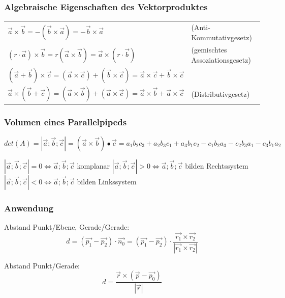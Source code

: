 	\subsubsection{Algebraische Eigenschaften des Vektorproduktes}
		\begin{tabular}{ll}
			$\vec{a}\times\vec{b} = -(\vec{b}\times\vec{a}) = -\vec{b}\times\vec{a}$
			&(Anti-Kommutativgesetz)\\
			$(r\cdot\vec{a})\times\vec{b} = r(\vec{a}\times\vec{b}) = \vec{a}\times(r\cdot\vec{b})$
			&(gemischtes Assoziationsgesetz)\\
			$(\vec{a}+\vec{b})\times\vec{c} = (\vec{a}\times\vec{c})+(\vec{b}\times\vec{c})
			= \vec{a}\times\vec{c}+\vec{b}\times\vec{c}$\\
			$\vec{a}\times(\vec{b}+\vec{c}) = (\vec{a}\times\vec{b})+(\vec{a}\times\vec{c})
			= \vec{a}\times\vec{b}+\vec{a}\times\vec{c}$ &(Distributivgesetz)
		\end{tabular}
	
	\subsubsection{Volumen eines Parallelpipeds}
		\begin{equation*}
			det(A) = |\vec{a}; \vec{b}; \vec{c}| = (\vec{a} \times \vec{b}) \bullet \vec{c} = a_1b_2c_3 + a_2b_3c_1 + a_3b_1c_2 - c_1b_2a_3 - c_2b_3a_1 - c_3b_1a_2
		\end{equation*}

		$|\vec{a}; \vec{b}; \vec{c}| = 0 \Leftrightarrow \vec{a}; \vec{b}; \vec{c}$ komplanar \qquad 
		$|\vec{a}; \vec{b}; \vec{c}| > 0 \Leftrightarrow \vec{a}; \vec{b}; \vec{c}$ bilden Rechtssystem \qquad
		$|\vec{a}; \vec{b}; \vec{c}| < 0 \Leftrightarrow \vec{a}; \vec{b}; \vec{c}$ bilden Linkssystem

	\subsubsection{Anwendung}
		Abstand Punkt/Ebene, Gerade/Gerade:
		\begin{equation*}
			d = (\vec{p_1} - \vec{p_2}) \cdot \vec{n_0} = (\vec{p_1} - \vec{p_2}) \cdot \frac{\vec{r_1} \times \vec{r_2}}{|\vec{r_1} \times \vec{r_2}|}
		\end{equation*} 

		Abstand Punkt/Gerade:
		\begin{equation*}
			d = \frac{\vec{r} \times (\vec{p} - \vec{p_0})}{|\vec{r}|}
		\end{equation*}



























